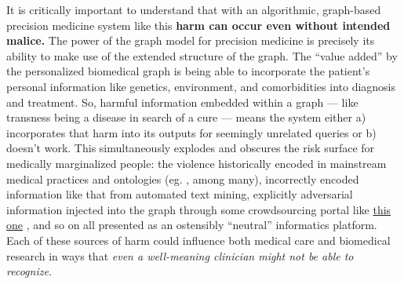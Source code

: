 It is critically important to understand that with an algorithmic,
graph-based precision medicine system like this \textbf{harm can occur
even without intended malice.} The power of the graph model for
precision medicine is precisely its ability to make use of the extended
structure of the graph. The ``value added'' by
the personalized biomedical graph is being able to incorporate the
patient's personal information like genetics, environment, and
comorbidities into diagnosis and treatment. So, harmful information
embedded within a graph --- like transness being a disease in search of
a cure --- means the system either a) incorporates that harm into its
outputs for seemingly unrelated queries or b) doesn't work. This
simultaneously explodes and obscures the risk surface for medically
marginalized people: the violence historically encoded in mainstream
medical practices and ontologies (eg. \cite{ramTransphobiaEncodedExamination2021, ashleyMisuseGenderDysphoria2019} , among many), incorrectly encoded information like that from
automated text mining, explicitly adversarial information injected into
the graph through some crowdsourcing portal like
\href{https://collaboratory.semanticscience.org/}{this one} \cite{masstrichtu-idsKnowledgeCollaboratory2022} , and so on all presented
as an ostensibly ``neutral'' informatics platform. Each of these sources
of harm could influence both medical care and biomedical research in
ways that \emph{even a well-meaning clinician might not be able to
recognize.}

